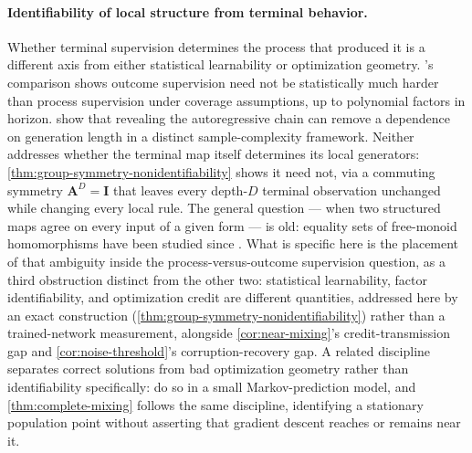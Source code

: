 \paragraph{Identifiability of local structure from terminal behavior.}
Whether terminal supervision determines the process that produced it is a
different axis from either statistical learnability or optimization
geometry. \citet{jia2025verify}'s comparison shows outcome supervision
need not be statistically much harder than process supervision under
coverage assumptions, up to polynomial factors in horizon.
\citet{hanneke2026samplecomplexityautoregressivereasoning} show that
revealing the autoregressive chain can remove a dependence on generation
length in a distinct sample-complexity framework. Neither addresses
whether the terminal map itself determines its local generators:
\cref{thm:group-symmetry-nonidentifiability} shows it need not, via a
commuting symmetry $\bm A^D=\bm I$ that leaves every depth-$D$ terminal
observation unchanged while changing every local rule. The general
question --- when two structured maps agree on every input of a given
form --- is old: equality sets of free-monoid homomorphisms have been
studied since \citet{salomaa1978equality}. What is specific here is the
placement of that ambiguity inside the process-versus-outcome supervision
question, as a third obstruction distinct from the other two: statistical
learnability, factor identifiability, and optimization credit are
different quantities, addressed here by an exact construction
(\cref{thm:group-symmetry-nonidentifiability}) rather than a trained-network
measurement, alongside \cref{cor:near-mixing}'s credit-transmission gap and
\cref{cor:noise-threshold}'s corruption-recovery gap. A related discipline
separates correct solutions from bad optimization geometry rather than
identifiability specifically: \citet{makkuva2025attentionmarkov} do so in a
small Markov-prediction model, and \cref{thm:complete-mixing} follows the
same discipline, identifying a stationary population point without
asserting that gradient descent reaches or remains near it.

